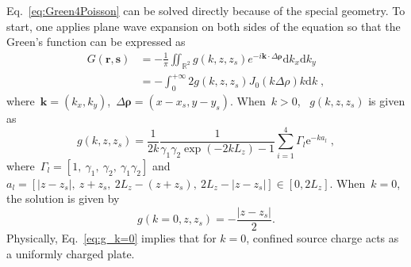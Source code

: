 \documentclass[aps,prl,reprint,showpacs,floatfix,superscriptaddress]{revtex4-2}
\newcommand{\V}[1]{\boldsymbol{#1}} %
\renewcommand{\d}[1]{\delta#1} %
\newcommand{\abs}[1]{\left|#1\right|} %
\newcommand{\eps}{\epsilon}
\begin{document}
Eq.~\eqref{eq:Green4Poisson} can be solved directly because of the special geometry.
To start, one applies plane wave expansion on both sides of the equation so that the Green's function can be expressed as 
\begin{equation}\label{eq:G_point_charge}
    \begin{split}
        G(\V{r},\V{s}) & = - \frac{1}{\pi} \iint_{\mathbb{R}^2} g(k, z, z_s) e^{-i \V{k} \cdot \Delta \V{\rho}} \text{d} k_x \text{d} k_y \\
        & = - \int_{0}^{+\infty} 2 g(k, z, z_s) J_0(k \Delta \rho) k \text{d}k\;,
    \end{split}
\end{equation}
where~$\V{k} = (k_x, k_y)$,~$\Delta \V{\rho} = (x - x_s, y - y_s)$.
When~$k>0$, ~$g(k, z, z_s)$ 
is given as
\begin{equation}\label{eq:g_solution}
    g(k, z, z_s) = \frac{1}{2k} \frac{1}{\gamma_1 \gamma_2 \exp{(-2 k L_z)} - 1} \sum_{i = 1}^{4} \Gamma_l \text{e}^{-k a_l}\;,
\end{equation}
where~$\Gamma_l = \left[1, ~\gamma_1, ~\gamma_2, ~\gamma_1 \gamma_2 \right]$ and~$a_l = [\abs{z - z_s}, ~z + z_s, ~2L_z - (z + z_s), ~2L_z - \abs{z - z_s}] \in [0, 2L_z]$.
When~$k = 0$, the solution is given by
\begin{equation}\label{eq:g_k=0}
    g(k = 0, z, z_s) = - \frac{\abs{z - z_s}}{2}.
\end{equation}
Physically, Eq.~\eqref{eq:g_k=0} implies that for $k=0$, confined source charge acts as a uniformly charged plate.
\end{document}
